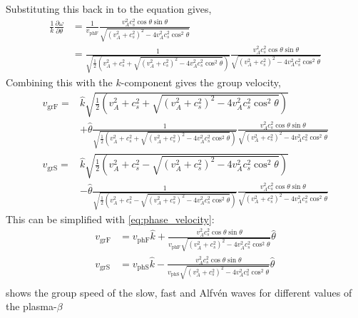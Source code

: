 \documentclass[a4paper]{article}
\numberwithin{figure}{section}
\numberwithin{equation}{section}
\begin{document}
Substituting this back in to the equation gives,
\begin{align*}
     \frac{1}{k}\frac{\partial \omega}{\partial \theta} &= \frac{1}{v_{\text{phF}}}  \frac{v_A^2c_s^2\cos\theta\sin\theta}{\sqrt{(v_A^2 + c_s^2)^2 - 4v_A^2c_s^2\cos^2\theta}}\\
     &= \frac{1}{\sqrt{\frac{1}{2}\left(v_A^2 + c_s^2 + \sqrt{(v_A^2 + c_s^2)^2 - 4v_A^2c_s^2\cos^2\theta}\right)}}\frac{v_A^2c_s^2\cos\theta\sin\theta}{\sqrt{(v_A^2 + c_s^2)^2 - 4v_A^2c_s^2\cos^2\theta}}
\end{align*}
Combining this with the $k$-component gives the group velocity,
\begin{align*}
    v_\text{grF} = &\hat{k}\sqrt{\frac{1}{2}\left(v_A^2 + c_s^2 + \sqrt{(v_A^2 + c_s^2)^2 - 4v_A^2c_s^2\cos^2\theta}\right)}\\ &+ \hat{\theta}\frac{1}{\sqrt{\frac{1}{2}\left(v_A^2 + c_s^2 + \sqrt{(v_A^2 + c_s^2)^2 - 4v_A^2c_s^2\cos^2\theta}\right)}}\frac{v_A^2c_s^2\cos\theta\sin\theta}{\sqrt{(v_A^2 + c_s^2)^2 - 4v_A^2c_s^2\cos^2\theta}}\\
    v_\text{grS} = &\hat{k}\sqrt{\frac{1}{2}\left(v_A^2 + c_s^2 - \sqrt{(v_A^2 + c_s^2)^2 - 4v_A^2c_s^2\cos^2\theta}\right)}\\ &- \hat{\theta}\frac{1}{\sqrt{\frac{1}{2}\left(v_A^2 + c_s^2 - \sqrt{(v_A^2 + c_s^2)^2 - 4v_A^2c_s^2\cos^2\theta}\right)}}\frac{v_A^2c_s^2\cos\theta\sin\theta}{\sqrt{(v_A^2 + c_s^2)^2 - 4v_A^2c_s^2\cos^2\theta}}
\end{align*}
This can be simplified with \cref{eq:phase_velocity}:
\begin{align*}
	v_{\text{grF}} &= v_\text{phF}  \hat{k} + \frac{v_A^2c_s^2 \cos \theta \sin \theta}{v_\text{phF} \sqrt{(v_A^2 + c_s^2)^2 - 4v_A^2c_s^2 \cos^2 \theta}} \hat{\theta}\\
	v_{\text{grS}} &= v_\text{phS}  \hat{k} - \frac{v_A^2c_s^2 \cos \theta \sin \theta}{v_\text{phS} \sqrt{(v_A^2 + c_s^2)^2 - 4v_A^2c_s^2 \cos^2 \theta}} \hat{\theta}\\
\end{align*}
 shows the group speed of the slow, fast and Alfv\'en waves for different values of the plasma-$\beta$
\end{document}
